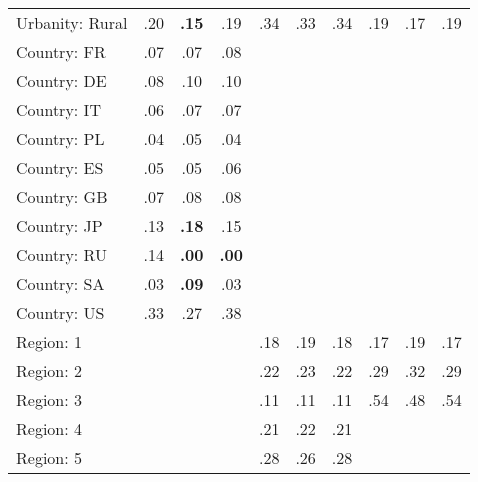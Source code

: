 \begin{tabular}[t]{lccccccccc}
Urbanity: Rural & .20 & \textbf{.15} & .19 & .34 & .33 & .34 & .19 & .17 & .19\\
\addlinespace
Country: FR & .07 & .07 & .08 &  &  &  &  &  & \\
Country: DE & .08 & .10 & .10 &  &  &  &  &  & \\
Country: IT & .06 & .07 & .07 &  &  &  &  &  & \\
Country: PL & .04 & .05 & .04 &  &  &  &  &  & \\
Country: ES & .05 & .05 & .06 &  &  &  &  &  & \\
Country: GB & .07 & .08 & .08 &  &  &  &  &  & \\
Country: JP & .13 & \textbf{.18} & .15 &  &  &  &  &  & \\
Country: RU & .14 & \textbf{.00} & \textbf{.00} &  &  &  &  &  & \\
Country: SA & .03 & \textbf{.09} & .03 &  &  &  &  &  & \\
Country: US & .33 & .27 & .38 &  &  &  &  &  & \\
\addlinespace
Region: 1 &  &  &  & .18 & .19 & .18 & .17 & .19 & .17\\
Region: 2 &  &  &  & .22 & .23 & .22 & .29 & .32 & .29\\
Region: 3 &  &  &  & .11 & .11 & .11 & .54 & .48 & .54\\
Region: 4 &  &  &  & .21 & .22 & .21 &  &  & \\
Region: 5 &  &  &  & .28 & .26 & .28 &  &  & \\
\bottomrule
\end{tabular}